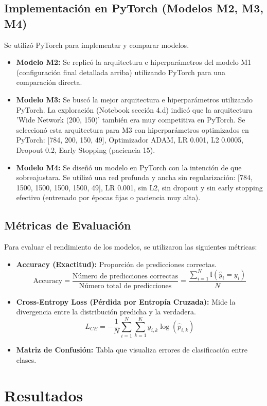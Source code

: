 \documentclass[11pt]{article}
\begin{document}
\subsection{Implementación en PyTorch (Modelos M2, M3, M4)}
Se utilizó PyTorch para implementar y comparar modelos.
\begin{itemize}
    \item \textbf{Modelo M2:} Se replicó la arquitectura e hiperparámetros del modelo M1 (configuración final detallada arriba) utilizando PyTorch para una comparación directa.
    \item \textbf{Modelo M3:} Se buscó la mejor arquitectura e hiperparámetros utilizando PyTorch. La exploración (Notebook sección 4.d) indicó que la arquitectura 'Wide Network (200, 150)' también era muy competitiva en PyTorch. Se seleccionó esta arquitectura para M3 con hiperparámetros optimizados en PyTorch: [784, 200, 150, 49], Optimizador ADAM, LR 0.001, L2 0.0005, Dropout 0.2, Early Stopping (paciencia 15).
    \item \textbf{Modelo M4:} Se diseñó un modelo en PyTorch con la intención de que sobreajustara. Se utilizó una red profunda y ancha sin regularización: [784, 1500, 1500, 1500, 1500, 49], LR 0.001, sin L2, sin dropout y sin early stopping efectivo (entrenado por épocas fijas o paciencia muy alta).
\end{itemize}

\subsection{Métricas de Evaluación}
Para evaluar el rendimiento de los modelos, se utilizaron las siguientes métricas:
\begin{itemize}
    \item \textbf{Accuracy (Exactitud):} Proporción de predicciones correctas. $$\text{Accuracy} = \frac{\text{Número de predicciones correctas}}{\text{Número total de predicciones}} = \frac{\sum_{i=1}^{N} \mathbb{I}(\hat{y}_i = y_i)}{N}$$
    \item \textbf{Cross-Entropy Loss (Pérdida por Entropía Cruzada):} Mide la divergencia entre la distribución predicha y la verdadera. $$L_{CE} = -\frac{1}{N} \sum_{i=1}^{N} \sum_{k=1}^{K} y_{i,k} \log(\hat{p}_{i,k})$$
    \item \textbf{Matriz de Confusión:} Tabla que visualiza errores de clasificación entre clases.
\end{itemize}
\section{Resultados}
\end{document}
